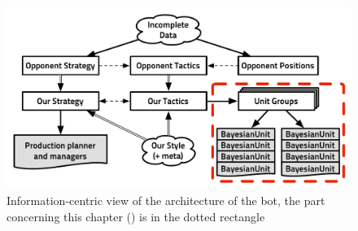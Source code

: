 
\begin{figure}[ht]
\begin{center}
\includegraphics[width=13cm]{images/starcraft_bbq_concept_MICRO.pdf}
\end{center}
\caption{Information-centric view of the architecture of the bot, the part concerning this chapter () is in the dotted rectangle}
\label{fig:conceptMICRO}
\end{figure}

